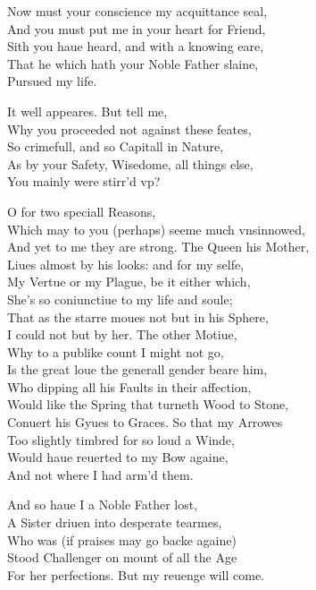 \documentclass[a5paper,DIV=calc,11pt]{scrbook}
\newcommand{\updatemarks}{\markboth{Act \Roman{act}}{Scene \Roman{act}--\Roman{scene}}}
\begin{document}
\updatemarks


\begin{drama*}
    \kingspeaks Now must your conscience my acquittance seal,\\
    And you must put me in your heart for Friend,\\
    Sith you haue heard, and with a knowing eare,\\
    That he which hath your Noble Father slaine,\\
    Pursued my life.
    
    \laerspeaks It well appeares. But tell me,\\
    Why you proceeded not against these feates,\\
    So crimefull, and so Capitall in Nature,\\
    As by your Safety, Wisedome, all things else,\\
    You mainly were stirr'd vp?
    
    \kingspeaks O for two speciall Reasons,\\
    Which may to you (perhaps) seeme much vnsinnowed,\\
    And yet to me they are strong. The Queen his Mother,\\
    Liues almost by his looks: and for my selfe,\\
    My Vertue or my Plague, be it either which,\\
    She's so coniunctiue to my life and soule;\\
    That as the starre moues not but in his Sphere,\\
    I could not but by her. The other Motiue,\\
    Why to a publike count I might not go,\\
    Is the great loue the generall gender beare him,\\
    Who dipping all his Faults in their affection,\\
    Would like the Spring that turneth Wood to Stone,\\
    Conuert his Gyues to Graces. So that my Arrowes\\
    Too slightly timbred for so loud a Winde,\\
    Would haue reuerted to my Bow againe,\\
    And not where I had arm'd them.
    
    \laerspeaks And so haue I a Noble Father lost,\\
    A Sister driuen into desperate tearmes,\\
    Who was (if praises may go backe againe)\\
    Stood Challenger on mount of all the Age\\
    For her perfections. But my reuenge will come.
    

\end{drama*}
\end{document}
